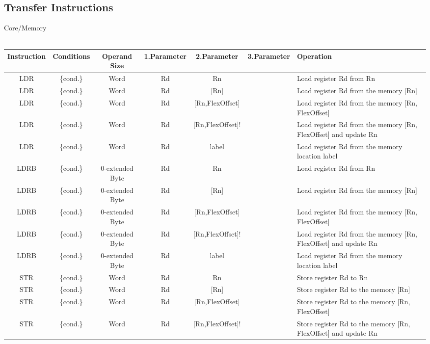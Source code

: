 {\begin{landscape}
\section{Transfer Instructions}
{\rot Core/Memory}\\
\\
\begin{tabular}{|c|c|c|c|c|c|l|}
\hline
Instruction & Conditions & Operand Size & 1.Parameter & 2.Parameter & 3.Parameter & Operation\\
\hline
LDR & \{cond.\} & Word & Rd & Rn &  & Load register Rd from Rn\\
\hline
LDR & \{cond.\} & Word & Rd & [Rn] &  & Load register Rd from the memory [Rn]\\
\hline
LDR & \{cond.\} & Word & Rd & [Rn,FlexOffset] &  & Load register Rd from the memory [Rn, FlexOffset]\\
\hline
LDR & \{cond.\} & Word & Rd & [Rn,FlexOffset]! &  & Load register Rd from the memory [Rn, FlexOffset] and update Rn\\
\hline
LDR & \{cond.\} & Word & Rd & label &  & Load register Rd from the memory location label\\
\hline
\hline
LDRB & \{cond.\} & 0-extended Byte & Rd & Rn &  & Load register Rd from Rn\\
\hline
LDRB & \{cond.\} & 0-extended Byte & Rd & [Rn] &  & Load register Rd from the memory [Rn]\\
\hline
LDRB & \{cond.\} & 0-extended Byte & Rd & [Rn,FlexOffset] &  & Load register Rd from the memory [Rn, FlexOffset]\\
\hline
LDRB & \{cond.\} & 0-extended Byte & Rd & [Rn,FlexOffset]! &  & Load register Rd from the memory [Rn, FlexOffset] and update Rn\\
\hline
LDRB & \{cond.\} & 0-extended Byte & Rd & label &  & Load register Rd from the memory location label\\
\hline
\hline
STR & \{cond.\} & Word & Rd & Rn &  & Store register Rd to Rn\\
\hline
STR & \{cond.\} & Word & Rd & [Rn] &  & Store register Rd to the memory [Rn]\\
\hline
STR & \{cond.\} & Word & Rd & [Rn,FlexOffset] &  & Store register Rd to the memory [Rn, FlexOffset]\\
\hline
STR & \{cond.\} & Word & Rd & [Rn,FlexOffset]! &  & Store register Rd to the memory [Rn, FlexOffset] and update Rn\\

\end{tabular}
\end{landscape}}
